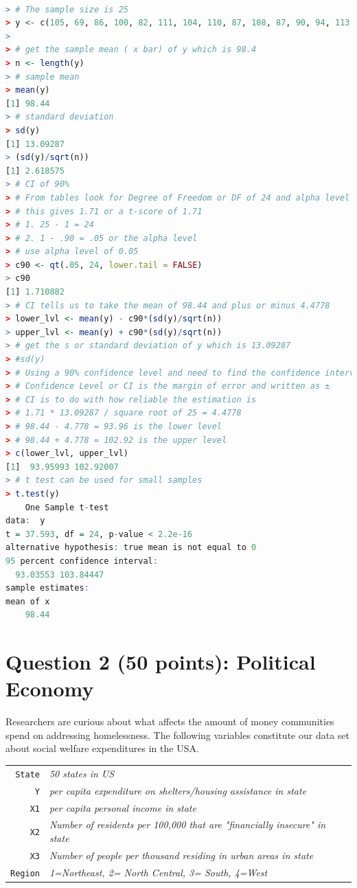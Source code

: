\documentclass[12pt,letterpaper]{article}
\begin{document}
\begin{lstlisting}[language=R]

> # The sample size is 25
> y <- c(105, 69, 86, 100, 82, 111, 104, 110, 87, 108, 87, 90, 94, 113, 112, 98, 80, 97, 95, 111, 114, 89, 95, 126, 98)
> 
> # get the sample mean ( x bar) of y which is 98.4
> n <- length(y) 
> # sample mean
> mean(y)
[1] 98.44
> # standard deviation
> sd(y)
[1] 13.09287
> (sd(y)/sqrt(n))
[1] 2.618575
> # CI of 90%
> # From tables look for Degree of Freedom or DF of 24 and alpha level of 0.05
> # this gives 1.71 or a t-score of 1.71
> # 1. 25 - 1 = 24
> # 2. 1 - .90 = .05 or the alpha level
> # use alpha level of 0.05
> c90 <- qt(.05, 24, lower.tail = FALSE)
> c90
[1] 1.710882
> # CI tells us to take the mean of 98.44 and plus or minus 4.4778
> lower_lvl <- mean(y) - c90*(sd(y)/sqrt(n))
> upper_lvl <- mean(y) + c90*(sd(y)/sqrt(n))
> # get the s or standard deviation of y which is 13.09287
> #sd(y)
> # Using a 90% confidence level and need to find the confidence interval
> # Confidence Level or CI is the margin of error and written as ±
> # CI is to do with how reliable the estimation is
> # 1.71 * 13.09287 / square root of 25 = 4.4778
> # 98.44 - 4.778 = 93.96 is the lower level
> # 98.44 + 4.778 = 102.92 is the upper level
> c(lower_lvl, upper_lvl)
[1]  93.95993 102.92007
> # t test can be used for small samples
> t.test(y)
	One Sample t-test
data:  y
t = 37.593, df = 24, p-value < 2.2e-16
alternative hypothesis: true mean is not equal to 0
95 percent confidence interval:
  93.03553 103.84447
sample estimates:
mean of x 
    98.44 

\end{lstlisting}

\newpage

	\section*{Question 2 (50 points): Political Economy}

\noindent Researchers are curious about what affects the amount of money communities spend on addressing homelessness. The following variables constitute our data set about social welfare expenditures in the USA. \\
\vspace{.5cm}


\begin{tabular}{r|l}
	\texttt{State} &\emph{50 states in US} \\
	\texttt{Y} & \emph{per capita expenditure on shelters/housing assistance in state}\\
	\texttt{X1} &\emph{per capita personal income in state} \\
	\texttt{X2} &  \emph{Number of residents per 100,000 that are "financially insecure" in state}\\
	\texttt{X3} &  \emph{Number of people per thousand residing in urban areas in state} \\
	\texttt{Region} &  \emph{1=Northeast, 2= North Central, 3= South, 4=West} \\
\end{tabular}
\end{document}
